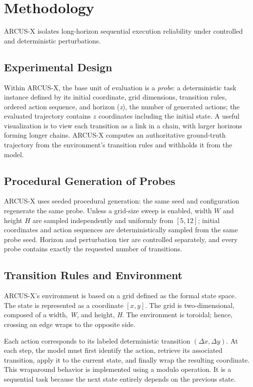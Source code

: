 \documentclass{article}
\begin{document}
\section{Methodology}

\label{Methodology}

ARCUS-X isolates long-horizon sequential execution reliability under controlled and deterministic perturbations.

\subsection{Experimental Design}

Within ARCUS-X, the base unit of evaluation is a \textit{probe}: a deterministic task instance defined by its initial coordinate, grid dimensions, transition rules, ordered action sequence, and horizon (\textit{z}), the number of generated actions; the evaluated trajectory contains $z$ coordinates including the initial state. A useful visualization is to view each transition as a link in a chain, with larger horizons forming longer chains. ARCUS-X computes an authoritative ground-truth trajectory from the environment's transition rules and withholds it from the model.

\subsection{Procedural Generation of Probes}

ARCUS-X uses seeded procedural generation: the same seed and configuration regenerate the same probe. Unless a grid-size sweep is enabled, width $W$ and height $H$ are sampled independently and uniformly from $[5,12]$; initial coordinates and action sequences are deterministically sampled from the same probe seed. Horizon and perturbation tier are controlled separately, and every probe contains exactly the requested number of transitions.

\subsection{Transition Rules and Environment}

ARCUS-X's environment is based on a grid defined as the formal state space. The state is represented as a coordinate $[x,y]$. The grid is two-dimensional, composed of a width, \textit{W}, and height, \textit{H}. The environment is toroidal; hence, crossing an edge wraps to the opposite side.

Each action corresponds to its labeled deterministic transition $(\Delta x, \Delta y)$. At each step, the model must first identify the action, retrieve its associated transition, apply it to the current state, and finally wrap the resulting coordinate. This wraparound behavior is implemented using a modulo operation. It is a sequential task because the next state entirely depends on the previous state.
\end{document}

